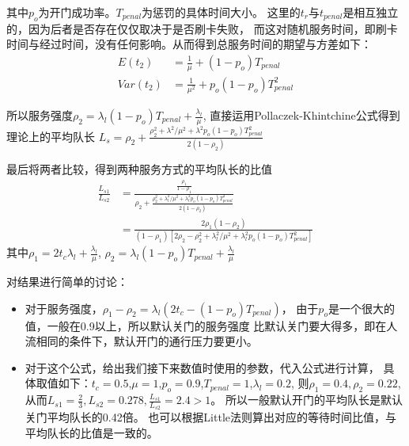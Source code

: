 其中$p_o$为开门成功率。$T_{penal}$为惩罚的具体时间大小。
这里的$t_r$与$t_{penal}$是相互独立的，因为后者是否存在仅仅取决于是否刷卡失败，
而这对随机服务时间，即刷卡时间与经过时间，没有任何影响。从而得到总服务时间的期望与方差如下：
\begin{equation}
    \begin{aligned}
        E(t_2) &=\frac{1}{\mu}+(1-p_o)T_{penal} \\
        Var(t_2)&=\frac{1}{\mu^2}+p_o(1-p_o)T_{penal}^2
    \end{aligned}
\end{equation}

所以服务强度$\rho_2=\lambda_l (1-p_o)T_{penal}+\frac{\lambda_l}{\mu}$,
直接运用Pollaczek-Khintchine公式得到理论上的平均队长
$L_s=\rho_2+\frac{\rho_2^2+\lambda^2/\mu^2+\lambda^2 p_o(1-p_o)T_{penal}^2}{2(1-\rho_2)}$
\par 最后将两者比较，得到两种服务方式的平均队长的比值
\begin{equation}
    \begin{aligned}
        \frac{L_{s1}}{L_{s2}}&=\frac{\frac{\rho_1}{1-\rho_1}}{\rho_2+\frac{\rho_2^2+\lambda_l^2/\mu^2+\lambda_l^2 p_o(1-p_o)T_{penal}^2}{2(1-\rho_2)}} \\
        &=\frac{2\rho_1(1-\rho_2)}{(1-\rho_1)[2\rho_2-\rho_2^2+\lambda_l^2/\mu^2+\lambda_l^2 p_o(1-p_o)T_{penal}^2]}
    \end{aligned}
\end{equation}
其中$\rho_1=2t_c\lambda_l+\frac{\lambda_l}{\mu}$,
$\rho_2=\lambda_l (1-p_o)T_{penal}+\frac{\lambda_l}{\mu}$
\par 对结果进行简单的讨论：
\begin{itemize}
    \item 对于服务强度，$\rho_1-\rho_2=\lambda_l(2t_c-(1-p_o)T_{penal})$，
    由于$p_o$是一个很大的值，一般在0.9以上，所以默认关门的服务强度
    比默认关门要大得多，即在人流相同的条件下，默认开门的通行压力要更小。
    \item 对于这个公式，给出我们接下来数值时使用的参数，代入公式进行计算，
    具体取值如下：$t_c=0.5$,$\mu=1$,$p_o=0.9$,$T_{penal}=1$,$\lambda_l=0.2$,
    则$\rho_1=0.4,\rho_2=0.22$,从而$L_{s1}=\frac{2}{3},L_{s2}=0.278,\frac{L_{s1}}{L_{s2}}=2.4>1$。
    所以一般默认开门的平均队长是默认关门平均队长的0.42倍。
    也可以根据Little法则算出对应的等待时间比值，与平均队长的比值是一致的。
\end{itemize}
